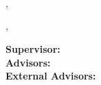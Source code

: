


\begin{titlepage}
    \begin{center}
        \vspace*{0.5cm}
        \begin{center}
	    	\\
	    	\hrulefill \\[1em]
		    {\Large\dcdepart}\\[0.5em] 
		    {\Large\dcprof}
	    \end{center}
	    \vspace*{2.5cm}
    
    \textbf{\huge\dcsubject}
	\vspace*{1.5cm}
	
	\huge
    \textbf{\dctitle}
    \vspace*{1.5cm}

    \Large\dcauthorlastname,~\dcauthorfirstname
    \vspace*{1.5cm}
    
    \begin{center}
         {\huge\dcrequirement}
    \vspace*{1.5cm}
    \end{center}
   
    
    \dcplace, \dcdate
    \vspace*{1.5cm}
 
    \hspace*{2cm}		
    \begin{center}
         {\parbox{\textwidth}{
		\begin{tabbing}
		    {\bf Supervisor:}\dcpruefer\\[2ex]
			{\bf Advisors:}\dcadvisor \\[2ex]
			{\bf External Advisors:}\dcadvisorex \\
		\end{tabbing}	
	}}
    \end{center}
    \end{center}
\end{titlepage}

